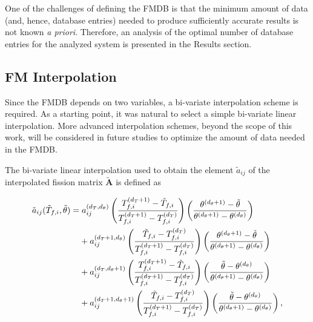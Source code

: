 \documentclass[preprint,review,12pt]{elsarticle}
\begin{document}
One of the challenges of defining the FMDB is that the minimum amount of data (and, hence, database entries) needed to produce sufficiently accurate results is not known \textit{a priori}. Therefore, an analysis of the optimal number of database entries for the analyzed system is presented in the Results section.   

\subsection{FM Interpolation}
Since the FMDB depends on two variables, a bi-variate interpolation scheme is required. As a starting point, it was natural to select a simple bi-variate linear interpolation. More advanced interpolation schemes, beyond the scope of this work, will be considered in future studies to optimize the amount of data needed in the FMDB.

The bi-variate linear interpolation used to obtain the element $\tilde{a}_{ij}$ of the interpolated fission matrix $\tilde{\mathbf{A}}$ is defined as

\begin{align}
\tilde{a}_{ij}(\tilde{T}_{f,i}, \tilde{\theta}) =&\; a_{ij}^{(d_T, d_{\theta})}
\left( \frac{T_{f,i}^{(d_T+1)} - \tilde{T}_{f,i}}{T_{f,i}^{(d_T+1)} - T_{f,i}^{(d_T)}} \right)
\left( \frac{\theta^{(d_{\theta}+1)} - \tilde{\theta}}{\theta^{(d_{\theta}+1)} - \theta^{(d_{\theta})}} \right) \notag \\
&+ a_{ij}^{(d_T+1, d_{\theta})}
\left( \frac{\tilde{T}_{f,i} - T_{f,i}^{(d_T)}}{T_{f,i}^{(d_T+1)} - T_{f,i}^{(d_T)}} \right)
\left( \frac{\theta^{(d_{\theta}+1)} - \tilde{\theta}}{\theta^{(d_{\theta}+1)} - \theta^{(d_{\theta})}} \right) \notag \\
&+ a_{ij}^{(d_T, d_{\theta}+1)}
\left( \frac{T_{f,i}^{(d_T+1)} - \tilde{T}_{f,i}}{T_{f,i}^{(d_T+1)} - T_{f,i}^{(d_T)}} \right)
\left( \frac{\tilde{\theta} - \theta^{(d_{\theta})}}{\theta^{(d_{\theta}+1)} - \theta^{(d_{\theta})}} \right) \notag \\
&+ a_{ij}^{(d_T+1, d_{\theta}+1)}
\left( \frac{\tilde{T}_{f,i} - T_{f,i}^{(d_T)}}{T_{f,i}^{(d_T+1)} - T_{f,i}^{(d_T)}} \right)
\left( \frac{\tilde{\theta} - \theta^{(d_{\theta})}}{\theta^{(d_{\theta}+1)} - \theta^{(d_{\theta})}} \right),
\end{align}
\end{document}
